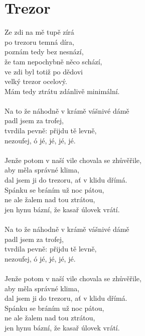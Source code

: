 \section{Trezor}
Ze zdi na mě tupě zírá\\
po trezoru temná díra,\\
poznám tedy bez nesnází,\\
že tam nepochybně něco schází,\\
ve zdi byl totiž po dědovi\\
velký trezor ocelový.\\
Mám tedy ztrátu zdánlivě minimální.\\
\\
Na to že náhodně v krámě vášnivé dámě\\
padl jsem za trofej,\\
tvrdila pevně: přijdu tě levně,\\
nezoufej, ó jé, jé, jé, jé.\\
\\
Jenže potom v naší vile chovala se zhůvěřile,\\
aby měla správné klima,\\
dal jsem ji do trezoru, ať v klidu dřímá.\\
Spánku se bráním už noc pátou,\\
ne ale žalem nad tou ztrátou,\\
jen hynu bázní, že kasař úlovek vrátí.\\
\\
Na to že náhodně v krámě vášnivé dámě\\
padl jsem za trofej,\\
tvrdila pevně: přijdu tě levně,\\
nezoufej, ó jé, jé, jé, jé.\\
\\
Jenže potom v naší vile chovala se zhůvěřile,\\
aby měla správné klima,\\
dal jsem ji do trezoru, ať v klidu dřímá.\\
Spánku se bráním už noc pátou,\\
ne ale žalem nad tou ztrátou,\\
jen hynu bázní, že kasař úlovek vrátí.\\